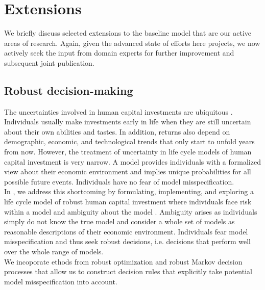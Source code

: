 \section{Extensions}\label{Extensions}
We briefly discuss selected extensions to the baseline model that are our active areas of research. Again, given the advanced state of efforts here projects, we now actively seek the input from domain experts for further improvement and subsequent joint publication.

\subsection{Robust decision-making}
The uncertainties involved in human capital investments are ubiquitous \citep{Becker.1964}. Individuals usually make investments early in life when they are still uncertain about their own abilities and tastes. In addition, returns also depend on demographic, economic, and technological trends that only start to unfold years from now. However, the treatment of uncertainty in life cycle models of human capital investment is very narrow. A model provides individuals with a formalized view about their economic environment and implies unique probabilities for all possible future events. Individuals have no fear of model misspecification.\\

\noindent In \citet{Eisenhauer.2020}, we address this shortcoming by formulating, implementing, and exploring a life cycle model of robust human capital investment where individuals face risk within a model and ambiguity about the model \citep{Arrow.1951}. Ambiguity arises as individuals simply do not know the true model and consider a whole set of models as reasonable descriptions of their economic environment. Individuals fear model misspecification and thus seek robust decisions, i.e. decisions that perform well over the whole range of models.\\

\noindent We incoporate ethods from robust optimization \citep{Ben-Tal.2009,Wiesemann.2014,Rahimian.2019} and robust Markov decision processes \citep{Iyengar.2005,Nilim.2005} that allow us to construct decision rules that explicitly take potential model misspecification into account.
